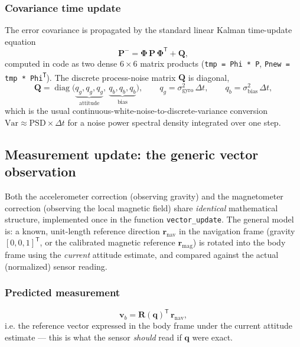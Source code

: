 \documentclass[11pt]{article}
\newcommand{\vect}[1]{\bm{#1}}
\newcommand{\mat}[1]{\bm{#1}}
\newcommand{\quat}{\vect{q}}
\newcommand{\transpose}{^{\mathsf{T}}}
\begin{document}
\subsubsection{Covariance time update}

The error covariance is propagated by the standard linear Kalman time-update equation
\begin{equation}
\mat P^{-} = \mat\Phi\, \mat P\, \mat\Phi\transpose + \mat Q,
\label{eq:cov-predict}
\end{equation}
computed in code as two dense $6\times6$ matrix products (\texttt{tmp = Phi * P}, \texttt{Pnew = tmp * Phi\textsuperscript{T}}). The discrete process-noise matrix $\mat Q$ is diagonal,
\begin{equation}
\mat Q = \operatorname{diag}\big(\underbrace{q_g,q_g,q_g}_{\text{attitude}},\ \underbrace{q_b,q_b,q_b}_{\text{bias}}\big),
\qquad
q_g = \sigma_{\text{gyro}}^2\,\Delta t, \qquad q_b = \sigma_{\text{bias}}^2\,\Delta t,
\label{eq:Q}
\end{equation}
which is the usual continuous-white-noise-to-discrete-variance conversion $\text{Var} \approx \text{PSD}\times\Delta t$ for a noise power spectral density integrated over one step.

\subsection{Measurement update: the generic vector observation}
\label{sec:update}

Both the accelerometer correction (observing gravity) and the magnetometer correction (observing the local magnetic field) share \emph{identical} mathematical structure, implemented once in the function \texttt{vector\_update}. The general model is: a known, unit-length reference direction $\vect r_{\text{nav}}$ in the navigation frame (gravity $[0,0,1]\transpose$, or the calibrated magnetic reference $\vect r_{\text{mag}}$) is rotated into the body frame using the \emph{current} attitude estimate, and compared against the actual (normalized) sensor reading.

\subsubsection{Predicted measurement}

\begin{equation}
\vect v_b = \mat R(\quat)\transpose\, \vect r_{\text{nav}},
\label{eq:vb}
\end{equation}
i.e. the reference vector expressed in the body frame under the current attitude estimate --- this is what the sensor \emph{should} read if $\quat$ were exact.
\end{document}
